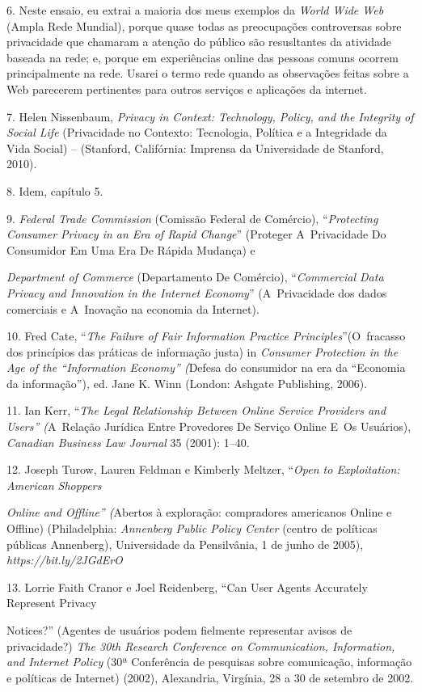 \begin{Parskip}
6. Neste ensaio, eu extrai a maioria dos meus exemplos da \emph{World
Wide Web} (Ampla Rede Mundial), porque quase todas as preocupações
controversas sobre privacidade que chamaram a atenção do público são
resusltantes da atividade baseada na rede; e, porque em experiências
online das pessoas comuns ocorrem principalmente na rede. Usarei o termo
rede quando as observações feitas sobre a Web parecerem pertinentes para
outros serviços e aplicações da internet.

7. Helen Nissenbaum, \emph{Privacy in Context: Technology, Policy, and
the Integrity of Social Life} (Privacidade no Contexto: Tecnologia,
Política e a Integridade da Vida Social) -- (Stanford, Califórnia:
Imprensa da Universidade de Stanford, 2010).

8. Idem, capítulo 5.

9. \emph{Federal Trade Commission} (Comissão Federal de Comércio),
``\emph{Protecting Consumer Privacy in an Era of Rapid Change}''
(Proteger A~Privacidade Do Consumidor Em Uma Era De Rápida Mudança) e

\emph{Department of Commerce} (Departamento De Comércio),
``\emph{Commercial Data Privacy and Innovation in the Internet
Economy}'' (A~Privacidade dos dados comerciais e A~Inovação na economia
da Internet).

10. Fred Cate, ``\emph{The Failure of Fair Information Practice
Principles}''(O~fracasso dos princípios das práticas de informação
justa) in \emph{Consumer Protection in the Age of the ``Information
Economy'' (}Defesa do consumidor na era da ``Economia da
informação'')\emph{,} ed. Jane K. Winn (London: Ashgate Publishing, 2006).

11. Ian Kerr, ``\emph{The Legal Relationship Between Online Service
Providers and Users'' (}A~Relação Jurídica Entre Provedores De Serviço
Online E~Os Usuários), \emph{Canadian Business Law Journal} 35 (2001):
1--40.

12. Joseph Turow, Lauren Feldman e Kimberly Meltzer, ``\emph{Open to
Exploitation: American Shoppers}

\emph{Online and Offline'' (}Abertos à exploração: compradores
americanos Online e Offline) (Philadelphia: \emph{Annenberg Public
Policy Center} (centro de políticas públicas Annenberg), Universidade da
Pensilvânia, 1 de junho de 2005),
\emph{https://bit.ly/2JGdErO}

13. Lorrie Faith Cranor e Joel Reidenberg, ``Can User Agents Accurately
Represent Privacy

Notices?'' (Agentes de usuários podem fielmente representar avisos de
privacidade?) \emph{The 30th Research Conference on Communication,
Information, and Internet Policy} (30ª Conferência de pesquisas sobre
comunicação, informação e políticas de Internet) (2002), Alexandria,
Virgínia, 28 a 30 de setembro de 2002.


\end{Parskip}

